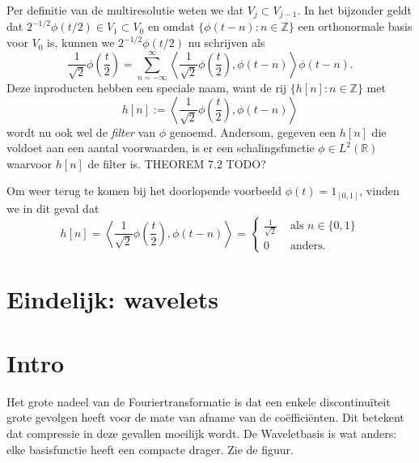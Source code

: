 \documentclass[11pt]{amsart}
\newcommand{\R}{\mathbb{R}}
\newcommand{\Z}{\mathbb{Z}}
\begin{document}
Per definitie van de multiresolutie weten we dat $V_j \subset V_{j-1}$. In het bijzonder geldt dat $2^{-1/2}\phi(t/2) \in V_1 \subset V_0$ en omdat $\{ \phi(t-n): n \in \Z\}$ een orthonormale basis voor $V_0$ is, kunnen we $2^{-1/2} \phi(t/2)$ nu schrijven als
\[
  \frac{1}{\sqrt{2}} \phi\left(\frac{t}{2}\right) = \sum_{n=-\infty}^{\infty} \left\langle \frac{1}{\sqrt{2}} \phi\left(\frac{t}{2}\right), \phi(t-n) \right\rangle \phi(t-n).
\]
Deze inproducten hebben een speciale naam, want de rij $\{h[n]: n \in \Z\}$ met
\[
  h[n] := \left\langle \frac{1}{\sqrt{2}} \phi\left(\frac{t}{2}\right), \phi(t-n) \right\rangle
\]
wordt nu ook wel de \emph{filter} van $\phi$ genoemd. Andersom, gegeven een $h[n]$ die voldoet aan een aantal voorwaarden, is er een schalingsfunctie $\phi \in L^2(\R)$ waarvoor $h[n]$ de filter is. THEOREM 7.2 TODO?

Om weer terug te komen bij het doorlopende voorbeeld $\phi(t) = 1_{[0,1]}$, vinden we in dit geval dat
\[
  h[n] = \left\langle \frac{1}{\sqrt{2}} \phi\left(\frac{t}{2}\right), \phi(t-n) \right\rangle = \begin{cases} \frac{1}{\sqrt{2}} & \text{ als } n \in \{0,1\} \\ 0 & \text{ anders.} \end{cases}
\]

\section{Eindelijk: wavelets}

\iffalse
\section{Intro}
Het grote nadeel van de Fouriertransformatie is dat een enkele discontinu\"iteit grote gevolgen heeft voor de mate van afname van de co\"effici\"enten. Dit betekent dat compressie in deze gevallen moeilijk wordt. De Waveletbasis is wat anders: elke basisfunctie heeft een compacte drager. Zie de figuur.
\begin{figure}[h]
\end{figure}
\end{document}
